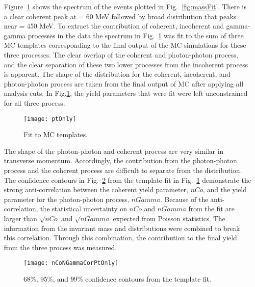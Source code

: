     Figure~\ref{fig:ptTemps} shows the \pt{} spectrum of the events plotted 
      in Fig.~\ref{fig:massFit}.  
    There is a clear coherent peak at \pt{} = 60 MeV followed by broad 
      distribution that peaks near \pt{} = 450 MeV. 
    To extract the contribution of coherent, incoherent and gamma-gamma 
      processes in the data the spectrum in  Fig.~\ref{fig:ptTemps} was fit to 
      the sum of three MC templates corresponding to the final output of the MC
      simulations for these three processes.       
    The clear overlap of the coherent and photon-photon process, and the 
      clear separation of these two lower \pt{} processes from the incoherent
      process is apparent.
    The shape of the \pt{} distribution for the coherent, incoherent, and 
      photon-photon process are taken from the final output of MC after
      applying all analysis cuts. 
    In Fig.\ref{fig:ptTemps}, the yield parameters that were fit were left
      unconstrained for all three process.

    \begin{figure}[!Hhbt]
      \centering
      \texttt{[image: ptOnly]}
      \caption{ Fit to MC \pt{} templates. }
      \label{fig:ptTemps}
    \end{figure}

    The shape of the photon-photon and coherent \JPsi{} process are very 
      similar in transverse momentum.
    Accordingly, the contribution from the photon-photon process and the 
      coherent process are difficult to separate from the \pt{} distribution.
    The confidence contours in Fig.~\ref{fig:ptOnlyCor} from the template fit
      in Fig.~\ref{fig:ptTemps} demonstrate the strong anti-correlation 
      between the coherent yield parameter, $nCo$, and the yield parameter 
      for the photon-photon process, $nGamma$.
    Because of the anti-correlation, the statistical uncertainty on $nCo$ and 
      $nGamma$ from the fit are larger than $\sqrt{nCo}$ and $\sqrt{nGamma}$
      expected from Poisson statistics. 
    The information from the invariant mass and \pt{} distributions were
      combined to break this correlation. 
    Through this combination, the contribution to the final yield from 
      the three process was measured.

    \begin{figure}[!Hhbt]
      \centering
      \texttt{[image: nCoNGammaCorPtOnly]}
      \caption{68\%, 95\%, and 99\% confidence contours from the \pt{} 
        template fit. }
      \label{fig:ptOnlyCor}
    \end{figure}

